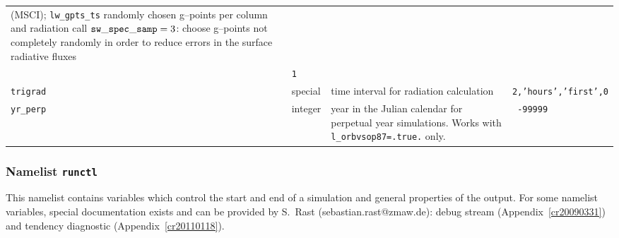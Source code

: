 \begin{longtable}{l@{\extracolsep\fill}lp{7cm}p{3.5cm}}
  (MSCI); {\tt lw\_gpts\_ts} randomly chosen g--points per column and
  radiation call\newline
  ${\tt sw\_spec\_samp} = 3$: choose g--points not completely randomly
  in order to reduce errors in the surface radiative fluxes\\
  &{\tt 1}\\
{\tt trigrad}\index{namelist variables!trigrad}
 & special& time interval for radiation calculation &
  {\tt 2,'hours','first',0}\\ 
{\tt yr\_perp}\index{namelist variables!yr\_perp}
 & integer & year in the Julian calendar for perpetual
year simulations. Works with {\tt l\_orbvsop87=.true.} only. & {\tt
  -99999} \\\hline
\end{longtable}



\subsubsection{Namelist {\tt runctl}}\label{secrunctl}

This namelist contains variables which control the start and end of a
simulation and general properties of the output. For some namelist
variables, special documentation 
exists and can be provided by S.~Rast (sebastian.rast@zmaw.de):
debug stream (Appendix~\ref{cr20090331}) and tendency diagnostic 
(Appendix~\ref{cr20110118}).

\setlength{\LTcapwidth}{\textwidth}
\setlength{\LTleft}{0pt}\setlength{\LTright}{0pt}

